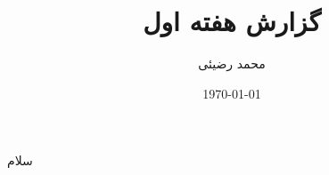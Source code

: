 \documentclass[12pt,onecolumn,a4paper]{article}
\title{گزارش هفته اول}
\author{محمد رضیئی}
\date{\today}
\begin{document}
    \maketitle
    
    سلام
\end{document}

